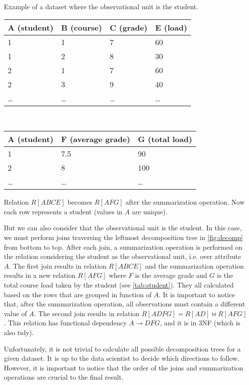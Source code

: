 \begin{tablebox}[label=tab:student]{Example of a dataset where the observational unit is the student.}
  \centering
  \begin{tabular}{llll}
    \toprule
    A (student) & B (course) & C (grade) & E (load) \\
    \midrule
    1 & 1 & 7 & 60 \\
    1 & 2 & 8 & 30 \\
    2 & 1 & 7 & 60 \\
    2 & 3 & 9 & 40 \\
    \dots & \dots & \dots & \dots \\
    \bottomrule
  \end{tabular}
  \\[1em]
  \begin{tabular}{lll}
    \toprule
    A (student) & F (average grade) & G (total load) \\
    \midrule
    1 & 7.5 & 90 \\
    2 & 8 & 100 \\
    \dots & \dots & \dots \\
    \bottomrule
  \end{tabular}
  \tcblower
  Relation $R[ABCE]$ becomes $R[AFG]$ after the summarization operation.  Now each row
  represents a student (values in $A$ are unique).
\end{tablebox}

But we can also consider that the observational unit is the student.  In this case, we
must perform joins traversing the leftmost decomposition tree in \cref{fig:decomp} from
bottom to top.  After each join, a summarization operation is performed on the relation
considering the student as the observational unit, i.e. over attribute $A$.  The first
join results in relation $R[ABCE]$ and the summarization operation results in a new
relation $R[AFG]$ where $F$ is the average grade and $G$ is the total course load taken by
the student (see \cref{tab:student}).  They all calculated based on the rows that are grouped in function of $A$.
It is important to notice that, after the summarization operation, all observations must
contain a different value of $A$.  The second join results in relation $R[ADFG] = R[AD]
\bowtie R[AFG]$.  This relation has functional dependency $A \to DFG$, and it is in 3NF
(which is also tidy).

Unfortunately, it is not trivial to calculate all possible decomposition trees for a given
dataset.  It is up to the data scientist to decide which directions to follow.  However,
it is important to notice that the order of the joins and summarization operations are
crucial to the final result.

